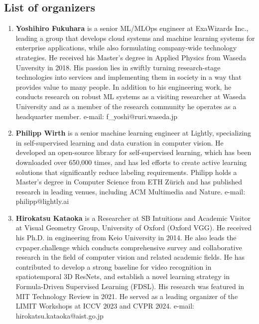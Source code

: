 \documentclass{article}
\def\c#1{\textcolor{gray}{#1}}
\begin{document}
\subsection{List of organizers}
\begin{enumerate}
    \item {\bf Yoshihiro Fukuhara} is a senior ML/MLOps engineer at ExaWizards Inc., leading a group that develops cloud systems and machine learning systems for enterprise applications, while also formulating company-wide technology strategies. He received his Master’s degree in Applied Physics from Waseda Unversity in 2018. His passion lies in swiftly turning research-stage technologies into services and implementing them in society in a way that provides value to many people. In addition to his engineering work, he conducts research on robust ML systems as a visiting researcher at Waseda University and as a member of the research community he operates as a headquarter member. e-mail: f\_yoshi@ruri.waseda.jp

    \item {\bf Philipp Wirth} is a senior machine learning engineer at Lightly, specializing in self-supervised learning and data curation in computer vision. He developed an open-source library for self-supervised learning, which has been downloaded over 650,000 times, and has led efforts to create active learning solutions that significantly reduce labeling requirements. Philipp holds a Master’s degree in Computer Science from ETH Zürich and has published research in leading venues, including ACM Multimedia and Nature. e-mail: philipp@lightly.ai

    \item
    {\bf Hirokatsu Kataoka} is a Researcher at SB Intuitions and Academic Visitor at Visual Geometry Group, University of Oxford (Oxford VGG). He received his Ph.D. in engineering from Keio University in 2014. He also leads the cvpaper.challenge which conducts comprehensive survey and collaborative research in the field of computer vision and related academic fields. He has contributed to develop a strong baseline for video recognition in spatiotemporal 3D ResNets, and establish a novel learning strategy in Formula-Driven Supervised Learning (FDSL). His research was featured in MIT Technology Review in 2021. He served as a leading organizer of the LIMIT Workshops at ICCV 2023 and CVPR 2024. e-mail: hirokatsu.kataoka@aist.go.jp


\end{enumerate}
\end{document}
